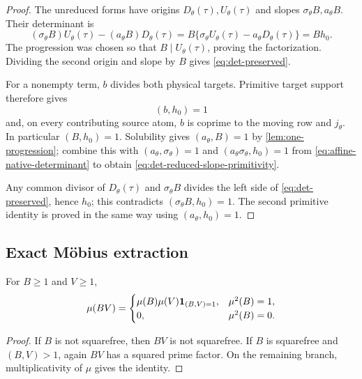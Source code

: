 \begin{proof}
The unreduced forms have origins
\(D_\theta(\tau),U_\theta(\tau)\) and slopes
\(\sigma_\theta B,a_\theta B\).  Their determinant is
\[
 (\sigma_\theta B)U_\theta(\tau)
 -(a_\theta B)D_\theta(\tau)
 =
 B\{\sigma_\theta U_\theta(\tau)
 -a_\theta D_\theta(\tau)\}
 =
 Bh_0.
\]
The progression was chosen so that \(B\mid U_\theta(\tau)\), proving
the factorization.  Dividing the second origin and slope by \(B\)
gives \eqref{eq:det-preserved}.

For a nonempty term, \(b\) divides both physical targets.  Primitive
target support therefore gives
\begin{equation}
 (b,h_0)=1
\label{eq:det-b-coprime-h}
\end{equation}
and, on every contributing source atom, \(b\) is coprime to the
moving row and \(j_\theta\).  In particular \((B,h_0)=1\).
Solubility gives \((a_\theta,B)=1\) by
\cref{lem:one-progression}; combine this with
\((a_\theta,\sigma_\theta)=1\) and
\((a_\theta\sigma_\theta,h_0)=1\) from
\eqref{eq:affine-native-determinant} to obtain
\eqref{eq:det-reduced-slope-primitivity}.

Any common divisor of \(D_\theta(\tau)\) and
\(\sigma_\theta B\) divides the left side of
\eqref{eq:det-preserved}, hence \(h_0\); this contradicts
\((\sigma_\theta B,h_0)=1\).  The second primitive identity is
proved in the same way using \((a_\theta,h_0)=1\).
\end{proof}

\subsection{Exact M\"obius extraction}

\begin{lemma}
\label{lem:forced-mobius-factor}
For \(B\ge1\) and \(V\ge1\),
\begin{equation}
 \mu(BV)
 =
 \begin{cases}
 \mu(B)\mu(V)\mathbf 1_{(B,V)=1},&\mu^2(B)=1,\\
 0,&\mu^2(B)=0.
 \end{cases}
\label{eq:forced-mobius-factor}
\end{equation}
\end{lemma}

\begin{proof}
If \(B\) is not squarefree, then \(BV\) is not squarefree.  If \(B\)
is squarefree and \((B,V)>1\), again \(BV\) has a squared prime
factor.  On the remaining branch, multiplicativity of \(\mu\) gives
the identity.
\end{proof}

